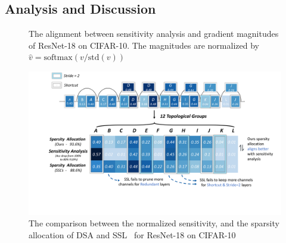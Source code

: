 \documentclass[runningheads]{llncs}
\newcommand{\dsa}{DSA\xspace}
\begin{document}
  \subsection{Analysis and Discussion}
  \label{sec:analysis}
  
  \begin{figure}[ht]
    \begin{center}
      \caption{The alignment between sensitivity analysis and gradient magnitudes of ResNet-18 on CIFAR-10. The magnitudes are normalized by $\hat{v}=\mbox{softmax}(v/\mbox{std}(v))$}
      \label{fig:sens_res18}
    \end{center}
  \end{figure}
  
  \begin{figure}[ht]
    \begin{center}
      \includegraphics[width=0.95\linewidth]{figs/heat.pdf}
      \caption{The comparison between the normalized sensitivity, and the sparsity allocation of \dsa and SSL~\cite{grouplasso} for ResNet-18 on CIFAR-10 }
      \label{fig:heat}
    \end{center}
  \end{figure}
  
\end{document}
